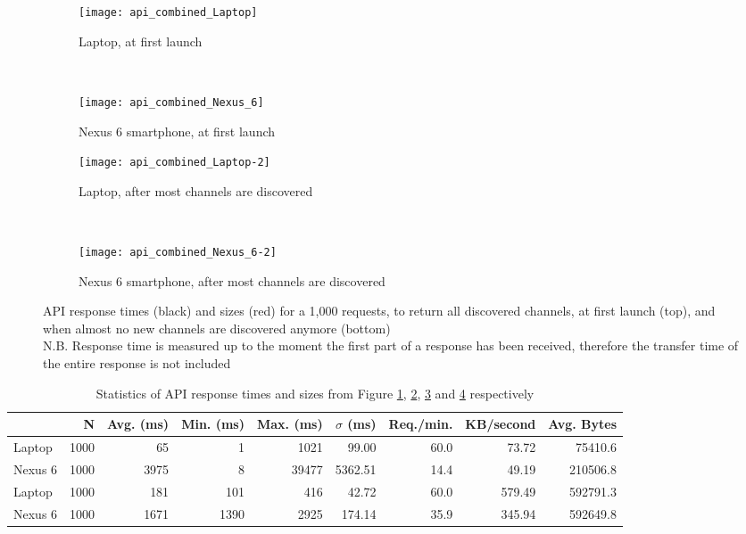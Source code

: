 \begin{figure}[H]
	\centering
	\begin{subfigure}{.49\textwidth}
		\texttt{[image: api\_combined\_Laptop]}
		\caption{Laptop, at first launch}
		\label{fig:api_Laptop}
	\end{subfigure}
	~
	\begin{subfigure}{.49\textwidth}
		\texttt{[image: api\_combined\_Nexus\_6]}
		\caption{Nexus 6 smartphone, at first launch}
		\label{fig:api_Nexus_6}
	\end{subfigure}
	
	\begin{subfigure}{.49\textwidth}
		\texttt{[image: api\_combined\_Laptop-2]}
		\caption{Laptop, after most channels are discovered}
		\label{fig:api_Laptop-2}
	\end{subfigure}
	~
	\begin{subfigure}{.49\textwidth}
		\texttt{[image: api\_combined\_Nexus\_6-2]}
		\caption{Nexus 6 smartphone, after most channels are discovered}
		\label{fig:api_Nexus_6-2}
	\end{subfigure}
\caption{API response times (black) and sizes (red) for a 1,000 requests, to return all discovered channels, at first launch (top), and when almost no new channels are discovered anymore (bottom)\\
N.B. Response time is measured up to the moment the first part of a response has been received, therefore the transfer time of the entire response is not included}
\label{fig:api_combined}
\end{figure}
\begin{table}[H]
  \begin{tabular}{l | *{8}{r}} \hline
  	  & N & Avg. (ms) & Min. (ms) & Max. (ms) & $\sigma$ (ms) & Req./min. & KB/second & Avg. Bytes \\ \hline \hline
  	 Laptop   & 1000 & 65     & 1       & 1021 & 99.00 & 60.0 & 73.72 & 75410.6 \\ \hline
  	 Nexus 6 & 1000 & 3975 & 8       & 39477 & 5362.51 & 14.4 & 49.19 & 210506.8 \\ \hline
  	 Laptop   & 1000 & 181   & 101   & 416   & 42.72   & 60.0 & 579.49 & 592791.3 \\ \hline
  	 Nexus 6 & 1000 & 1671 & 1390 & 2925 & 174.14 & 35.9 & 345.94 & 592649.8 \\ \hline
  \end{tabular}
  \caption{Statistics of API response times and sizes from Figure \ref{fig:api_Laptop}, \ref{fig:api_Nexus_6}, \ref{fig:api_Laptop-2} and \ref{fig:api_Nexus_6-2} respectively}
  \label{table:api_benchmark}
\end{table}
